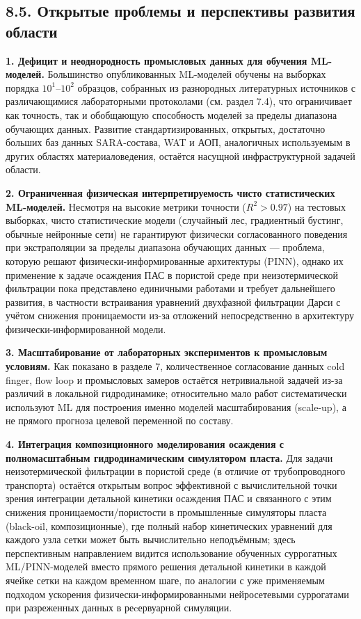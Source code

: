 \documentclass[11pt]{extarticle}
\begin{document}
\subsection{8.5. Открытые проблемы и перспективы развития области}\label{ux43eux442ux43aux440ux44bux442ux44bux435-ux43fux440ux43eux431ux43bux435ux43cux44b-ux438-ux43fux435ux440ux441ux43fux435ux43aux442ux438ux432ux44b-ux440ux430ux437ux432ux438ux442ux438ux44f-ux43eux431ux43bux430ux441ux442ux438}

\textbf{1. Дефицит и неоднородность промысловых данных для обучения ML-моделей.} Большинство опубликованных ML-моделей обучены на выборках порядка \(10^1\)--\(10^2\) образцов, собранных из разнородных литературных источников с различающимися лабораторными протоколами (см. раздел 7.4), что ограничивает как точность, так и обобщающую способность моделей за пределы диапазона обучающих данных. Развитие стандартизированных, открытых, достаточно больших баз данных SARA-состава, WAT и АОП, аналогичных используемым в других областях материаловедения, остаётся насущной инфраструктурной задачей области.

\textbf{2. Ограниченная физическая интерпретируемость чисто статистических ML-моделей.} Несмотря на высокие метрики точности (\(R^2 > 0.97\)) на тестовых выборках, чисто статистические модели (случайный лес, градиентный бустинг, обычные нейронные сети) не гарантируют физически согласованного поведения при экстраполяции за пределы диапазона обучающих данных --- проблема, которую решают физически-информированные архитектуры (PINN), однако их применение к задаче осаждения ПАС в пористой среде при неизотермической фильтрации пока представлено единичными работами и требует дальнейшего развития, в частности встраивания уравнений двухфазной фильтрации Дарси с учётом снижения проницаемости из-за отложений непосредственно в архитектуру физически-информированной модели.

\textbf{3. Масштабирование от лабораторных экспериментов к промысловым условиям.} Как показано в разделе 7, количественное согласование данных cold finger, flow loop и промысловых замеров остаётся нетривиальной задачей из-за различий в локальной гидродинамике; относительно мало работ систематически используют ML для построения именно моделей масштабирования (scale-up), а не прямого прогноза целевой переменной по составу.

\textbf{4. Интеграция композиционного моделирования осаждения с полномасштабным гидродинамическим симулятором пласта.} Для задачи неизотермической фильтрации в пористой среде (в отличие от трубопроводного транспорта) остаётся открытым вопрос эффективной с вычислительной точки зрения интеграции детальной кинетики осаждения ПАС и связанного с этим снижения проницаемости/пористости в промышленные симуляторы пласта (black-oil, композиционные), где полный набор кинетических уравнений для каждого узла сетки может быть вычислительно неподъёмным; здесь перспективным направлением видится использование обученных суррогатных ML/PINN-моделей вместо прямого решения детальной кинетики в каждой ячейке сетки на каждом временном шаге, по аналогии с уже применяемым подходом ускорения физически-информированными нейросетевыми суррогатами при разреженных данных в реcервуарной симуляции.
\end{document}
